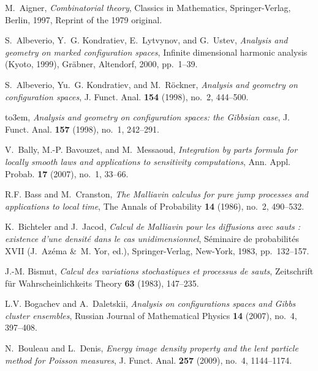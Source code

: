 \documentclass[11pt,a4paper]{amsart}
\begin{document}
\providecommand{\bysame}{\leavevmode\hbox to3em{\hrulefill}\thinspace}
\providecommand{\MR}[1]{}
\begin{thebibliography}{10}

 M.~Aigner, \emph{Combinatorial theory}, Classics
  in Mathematics, Springer-Verlag, Berlin, 1997, Reprint of the 1979
  original.

 S.~Albeverio, Y.~G. Kondratiev, E.~Lytvynov,
  and G.~Ustev, \emph{Analysis and geometry on marked configuration
    spaces}, Infinite dimensional harmonic analysis (Kyoto, 1999),
  Gr{\"a}bner, Altendorf, 2000, pp.~1--39.

 S.~Albeverio, Yu.~G. Kondratiev, and
  M.~R{\"o}ckner, \emph{Analysis and geometry on configuration
    spaces}, J. Funct. Anal. \textbf{154} (1998), no.~2, 444--500.

 \bysame, \emph{Analysis and geometry on
    configuration spaces: the {G}ibbsian case},
  J. Funct. Anal. \textbf{157} (1998), no.~1, 242--291.

 V.~Bally, M.-P. Bavouzet, and M.~Messaoud,
  \emph{Integration by parts formula for locally smooth laws and
    applications to sensitivity computations}, Ann.
  Appl. Probab. \textbf{17} (2007), no.~1, 33--66.

 R.F. Bass and M.~Cranston, \emph{The {M}alliavin
    calculus for pure jump processes and applications to local time},
  The Annals of Probability \textbf{14} (1986), no.~2, 490--532.

 K.~Bichteler and J.~Jacod, \emph{Calcul de
    {M}alliavin pour les diffusions avec sauts : existence d'une
    densit{\'e} dans le cas unidimensionnel}, S{\'e}minaire de
  probabilit{\'e}s XVII (J.~Az{\'e}ma \&~M. Yor, ed.),
  Springer-Verlag, New-York, 1983, pp.~132--157.

 J.-M. Bismut, \emph{Calcul des variations
    stochastiques et processus de sauts}, {Zeitschrift f{\"u}r
    Wahrscheinlichkeits Theory} \textbf{63} (1983), 147--235.

 L.V. Bogachev and A.~Daletskii,
  \emph{Analysis on configurations spaces and {G}ibbs cluster
    ensembles}, Russian Journal of Mathematical Physics \textbf{14}
  (2007), no.~4, 397--408.

 N.~Bouleau and L.~Denis, \emph{Energy image
    density property and the lent particle method for {P}oisson
    measures}, J. Funct. Anal. \textbf{257} (2009), no.~4, 1144--1174.


\end{thebibliography}
\end{document}
